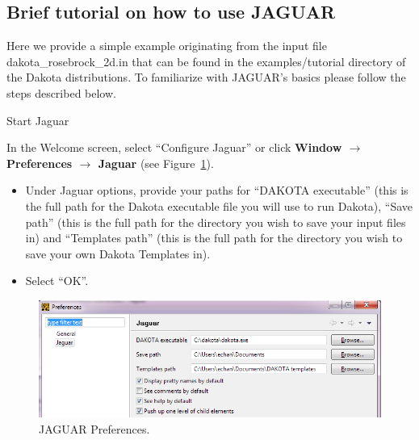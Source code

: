 \newpage
\subsection{Brief tutorial on how to use JAGUAR}

Here we provide a simple example originating from the input file dakota\_rosebrock\_2d.in that can be found in the examples/tutorial
directory of the Dakota distributions. To familiarize with JAGUAR's basics please follow the steps described below.

Start Jaguar

In the Welcome screen, select ``Configure Jaguar'' or click {\bf Window $\rightarrow$ Preferences $\rightarrow$ Jaguar} (see Figure~\ref{fig:input:0Preferences}).
\begin{itemize}
\item Under Jaguar options, provide your paths for ``DAKOTA executable'' (this is the full path for the Dakota executable file you will use to run Dakota), ``Save path'' (this is the full path for the directory you wish to save your input files in) and ``Templates path'' (this is the full path for the directory you wish to save your own Dakota Templates in).
\item Select ``OK''.
\end{itemize}
\begin{figure}[htbp]
  \centering
  \includegraphics[scale=0.6]{images/0Preferences}
  \caption{JAGUAR Preferences.}
  \label{fig:input:0Preferences}
\end{figure}


